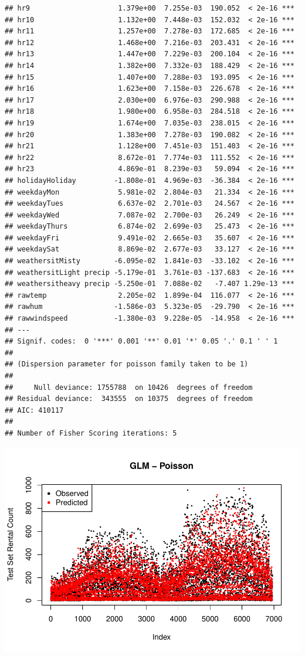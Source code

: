 \documentclass[
]{article}
\begin{document}
\begin{verbatim}
## hr9                     1.379e+00  7.255e-03  190.052  < 2e-16 ***
## hr10                    1.132e+00  7.448e-03  152.032  < 2e-16 ***
## hr11                    1.257e+00  7.278e-03  172.685  < 2e-16 ***
## hr12                    1.468e+00  7.216e-03  203.431  < 2e-16 ***
## hr13                    1.447e+00  7.229e-03  200.104  < 2e-16 ***
## hr14                    1.382e+00  7.332e-03  188.429  < 2e-16 ***
## hr15                    1.407e+00  7.288e-03  193.095  < 2e-16 ***
## hr16                    1.623e+00  7.158e-03  226.678  < 2e-16 ***
## hr17                    2.030e+00  6.976e-03  290.988  < 2e-16 ***
## hr18                    1.980e+00  6.958e-03  284.518  < 2e-16 ***
## hr19                    1.674e+00  7.035e-03  238.015  < 2e-16 ***
## hr20                    1.383e+00  7.278e-03  190.082  < 2e-16 ***
## hr21                    1.128e+00  7.451e-03  151.403  < 2e-16 ***
## hr22                    8.672e-01  7.774e-03  111.552  < 2e-16 ***
## hr23                    4.869e-01  8.239e-03   59.094  < 2e-16 ***
## holidayHoliday         -1.808e-01  4.969e-03  -36.384  < 2e-16 ***
## weekdayMon              5.981e-02  2.804e-03   21.334  < 2e-16 ***
## weekdayTues             6.637e-02  2.701e-03   24.567  < 2e-16 ***
## weekdayWed              7.087e-02  2.700e-03   26.249  < 2e-16 ***
## weekdayThurs            6.874e-02  2.699e-03   25.473  < 2e-16 ***
## weekdayFri              9.491e-02  2.665e-03   35.607  < 2e-16 ***
## weekdaySat              8.869e-02  2.677e-03   33.127  < 2e-16 ***
## weathersitMisty        -6.095e-02  1.841e-03  -33.102  < 2e-16 ***
## weathersitLight precip -5.179e-01  3.761e-03 -137.683  < 2e-16 ***
## weathersitheavy precip -5.250e-01  7.088e-02   -7.407 1.29e-13 ***
## rawtemp                 2.205e-02  1.899e-04  116.077  < 2e-16 ***
## rawhum                 -1.586e-03  5.323e-05  -29.790  < 2e-16 ***
## rawwindspeed           -1.380e-03  9.228e-05  -14.958  < 2e-16 ***
## ---
## Signif. codes:  0 '***' 0.001 '**' 0.01 '*' 0.05 '.' 0.1 ' ' 1
## 
## (Dispersion parameter for poisson family taken to be 1)
## 
##     Null deviance: 1755788  on 10426  degrees of freedom
## Residual deviance:  343555  on 10375  degrees of freedom
## AIC: 410117
## 
## Number of Fisher Scoring iterations: 5
\end{verbatim}

\includegraphics{draft_files/figure-latex/unnamed-chunk-10-1.pdf}
\end{document}
